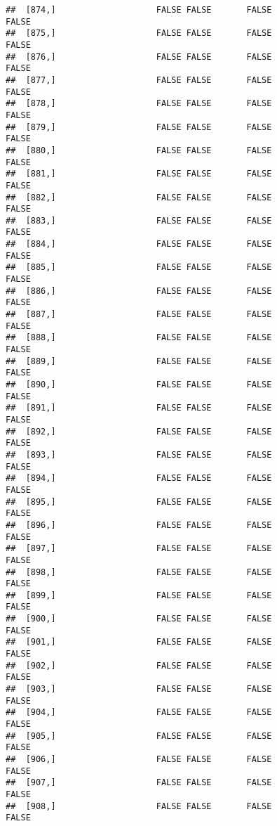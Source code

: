 \documentclass[
]{article}
\begin{document}
\begin{verbatim}
##  [874,]                    FALSE FALSE       FALSE                FALSE
##  [875,]                    FALSE FALSE       FALSE                FALSE
##  [876,]                    FALSE FALSE       FALSE                FALSE
##  [877,]                    FALSE FALSE       FALSE                FALSE
##  [878,]                    FALSE FALSE       FALSE                FALSE
##  [879,]                    FALSE FALSE       FALSE                FALSE
##  [880,]                    FALSE FALSE       FALSE                FALSE
##  [881,]                    FALSE FALSE       FALSE                FALSE
##  [882,]                    FALSE FALSE       FALSE                FALSE
##  [883,]                    FALSE FALSE       FALSE                FALSE
##  [884,]                    FALSE FALSE       FALSE                FALSE
##  [885,]                    FALSE FALSE       FALSE                FALSE
##  [886,]                    FALSE FALSE       FALSE                FALSE
##  [887,]                    FALSE FALSE       FALSE                FALSE
##  [888,]                    FALSE FALSE       FALSE                FALSE
##  [889,]                    FALSE FALSE       FALSE                FALSE
##  [890,]                    FALSE FALSE       FALSE                FALSE
##  [891,]                    FALSE FALSE       FALSE                FALSE
##  [892,]                    FALSE FALSE       FALSE                FALSE
##  [893,]                    FALSE FALSE       FALSE                FALSE
##  [894,]                    FALSE FALSE       FALSE                FALSE
##  [895,]                    FALSE FALSE       FALSE                FALSE
##  [896,]                    FALSE FALSE       FALSE                FALSE
##  [897,]                    FALSE FALSE       FALSE                FALSE
##  [898,]                    FALSE FALSE       FALSE                FALSE
##  [899,]                    FALSE FALSE       FALSE                FALSE
##  [900,]                    FALSE FALSE       FALSE                FALSE
##  [901,]                    FALSE FALSE       FALSE                FALSE
##  [902,]                    FALSE FALSE       FALSE                FALSE
##  [903,]                    FALSE FALSE       FALSE                FALSE
##  [904,]                    FALSE FALSE       FALSE                FALSE
##  [905,]                    FALSE FALSE       FALSE                FALSE
##  [906,]                    FALSE FALSE       FALSE                FALSE
##  [907,]                    FALSE FALSE       FALSE                FALSE
##  [908,]                    FALSE FALSE       FALSE                FALSE

\end{verbatim}
\end{document}
